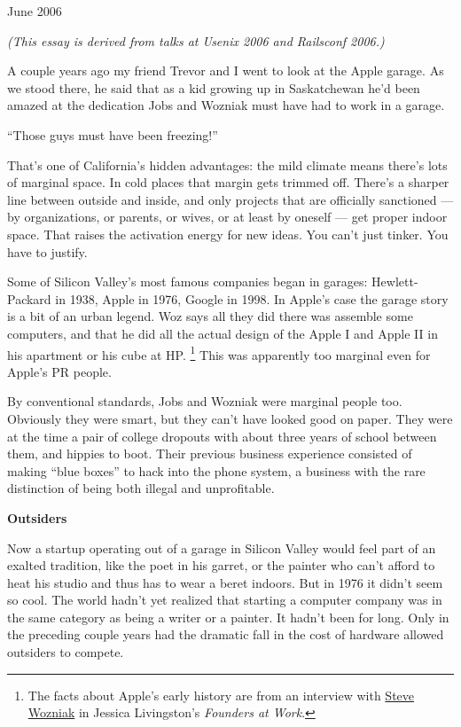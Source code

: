 \documentclass[12pt]{book}
\begin{document}
June 2006

\emph{(This essay is derived from talks at Usenix 2006 and Railsconf
2006.)}

A couple years ago my friend Trevor and I went to look at the Apple
garage. As we stood there, he said that as a kid growing up in
Saskatchewan he'd been amazed at the dedication Jobs and Wozniak must
have had to work in a garage.

``Those guys must have been freezing!''

That's one of California's hidden advantages: the mild climate means
there's lots of marginal space. In cold places that margin gets trimmed
off. There's a sharper line between outside and inside, and only
projects that are officially sanctioned --- by organizations, or
parents, or wives, or at least by oneself --- get proper indoor space.
That raises the activation energy for new ideas. You can't just tinker.
You have to justify.

Some of Silicon Valley's most famous companies began in garages:
Hewlett-Packard in 1938, Apple in 1976, Google in 1998. In Apple's case
the garage story is a bit of an urban legend. Woz says all they did
there was assemble some computers, and that he did all the actual design
of the Apple I and Apple II in his apartment or his cube at HP.
\footnote{The facts about Apple's early history are from an interview with
\href{http://foundersatwork.com/steve-wozniak.html}{Steve Wozniak} in
Jessica Livingston's \emph{Founders at Work}.} This was apparently too marginal even for
Apple's PR people.

By conventional standards, Jobs and Wozniak were marginal people too.
Obviously they were smart, but they can't have looked good on paper.
They were at the time a pair of college dropouts with about three years
of school between them, and hippies to boot. Their previous business
experience consisted of making ``blue boxes'' to hack into the phone
system, a business with the rare distinction of being both illegal and
unprofitable.

\textbf{Outsiders}

Now a startup operating out of a garage in Silicon Valley would feel
part of an exalted tradition, like the poet in his garret, or the
painter who can't afford to heat his studio and thus has to wear a beret
indoors. But in 1976 it didn't seem so cool. The world hadn't yet
realized that starting a computer company was in the same category as
being a writer or a painter. It hadn't been for long. Only in the
preceding couple years had the dramatic fall in the cost of hardware
allowed outsiders to compete.
\end{document}
